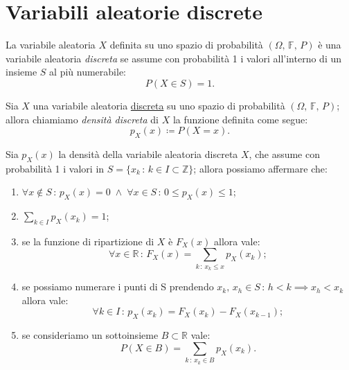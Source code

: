     \section{Variabili aleatorie discrete}
    \begin{defn}\label{defn:Variabili_aleatorie_discrete}
            La variabile aleatoria $X$ definita su uno spazio di probabilità $(\Omega,\,\mathbb{F},\,P)$ è una variabile aleatoria \emph{discreta} se assume con probabilità 1 i valori all'interno di un insieme $S$ al più numerabile: \[
                P(X \in S) = 1
            .\] 
        \end{defn}
        \begin{defn}\label{defn:Densità_discreta}
            Sia $X$ una variabile aleatoria \underline{discreta} su uno spazio di probabilità $(\Omega,\,\mathbb{F},\,P)$; allora chiamiamo \emph{densità discreta} di $X$ la funzione definita come segue: \[
                p_X(x) \coloneqq P(X = x)
            .\]
        \end{defn}
        \begin{prty}\label{prty:Densità_discreta}
            Sia  $p_X(x)$ la densità della variabile aleatoria discreta $X$, che assume con probabilità 1 i valori in $S = \{x_k \,:\, k \in I \subset \mathbb{Z}\}$; allora possiamo affermare che:
            \begin{enumerate}
                \item $\forall x \notin S \,:\, p_X(x) = 0 \;\land\; \forall x \in S \,:\, 0 \leq p_X(x) \leq 1$;
                \item $\sum_{k \in I} p_X(x_k) = 1$;
                \item se la funzione di ripartizione di $X$ è $F_X(x)$ allora vale:  \[
                    \forall x \in \mathbb{R} \,:\, F_X(x) = \sum_{k\,:\,x_k \leq x} p_X(x_k)
                ;\]
                \item se possiamo numerare i punti di S prendendo $x_k,\,x_h \in S \,:\, h < k \implies x_h < x_k$ allora vale: \[
                    \forall k \in I \,:\, p_X(x_k) = F_X(x_k) - F_X(x_{k-1})
                ;\]
                \item se consideriamo un sottoinsieme $B \subset \mathbb{R}$ vale: \[
                    P(X \in B) = \sum_{k \,:\, x_k \in B} p_X(x_k)
                .\]
            \end{enumerate}
        \end{prty}
